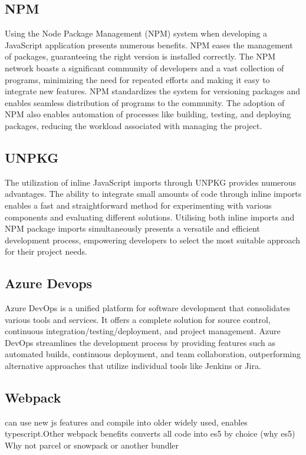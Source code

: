 \documentclass{l4proj}
\begin{document}
\subsection{NPM}
\text Using the Node Package Management (NPM) system when developing a JavaScript application presents numerous benefits. NPM eases the management of packages, guaranteeing the right version is installed correctly. The NPM network boasts a significant community of developers and a vast collection of programs, minimizing the need for repeated efforts and making it easy to integrate new features. NPM standardizes the system for versioning packages and enables seamless distribution of programs to the community. The adoption of NPM also enables automation of processes like building, testing, and deploying packages, reducing the workload associated with managing the project.


\subsection{UNPKG}
\text The utilization of inline JavaScript imports through UNPKG provides numerous advantages. The ability to integrate small amounts of code through inline imports enables a fast and straightforward method for experimenting with various components and evaluating different solutions. Utilising both inline imports and NPM package imports simultaneously presents a versatile and efficient development process, empowering developers to select the most suitable approach for their project needs.

\subsection{Azure Devops}
\text Azure DevOps is a unified platform for software development that consolidates various tools and services. It offers a complete solution for source control, continuous integration/testing/deployment, and project management. Azure DevOps streamlines the development process by providing features such as automated builds, continuous deployment, and team collaboration, outperforming alternative approaches that utilize individual tools like Jenkins or Jira.

\subsection{Webpack}
\text can use new js features and compile into older widely used, enables typescript.Other webpack benefits converts all code into es5 by choice (why es5)
Why not parcel or snowpack or another bundler
\end{document}
